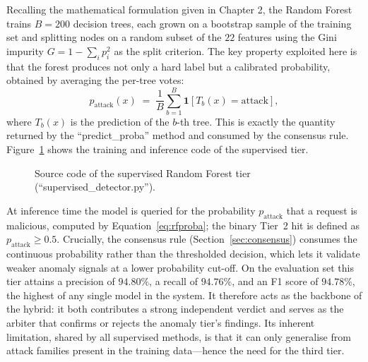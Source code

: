 \documentclass[12pt,a4paper]{report}
\begin{document}
Recalling the mathematical formulation given in Chapter 2, the Random Forest
trains $B = 200$ decision trees, each grown on a bootstrap sample of the
training set and splitting nodes on a random subset of the $22$ features
using the Gini impurity $G = 1 - \sum_i p_i^2$ as the split criterion. The
key property exploited here is that the forest produces not only a hard label
but a calibrated probability, obtained by averaging the per-tree votes:
\begin{equation}
  p_{\text{attack}}(x) \;=\; \frac{1}{B}\sum_{b=1}^{B} \mathbf{1}\!\left[T_b(x) = \text{attack}\right],
  \label{eq:rfproba}
\end{equation}
where $T_b(x)$ is the prediction of the $b$-th tree. This is exactly the
quantity returned by the ``predict\_proba'' method and consumed by the
consensus rule. Figure~\ref{fig:code-rf} shows the training and inference
code of the supervised tier.

\begin{figure}[ht]
  \centering
  \caption{Source code of the supervised Random Forest tier
           (``supervised\_detector.py'').}
  \label{fig:code-rf}
\end{figure}

At inference time the model is queried for the probability
$p_{\text{attack}}$ that a request is malicious, computed by
Equation~\eqref{eq:rfproba}; the binary Tier~2 hit is
defined as $p_{\text{attack}} \geq 0.5$. Crucially, the consensus rule
(Section~\ref{sec:consensus}) consumes the continuous probability rather
than the thresholded decision, which lets it validate weaker anomaly signals
at a lower probability cut-off. On the evaluation set this tier attains a
precision of $94.80\%$, a recall of $94.76\%$, and an F1 score of $94.78\%$,
the highest of any single model in the system. It therefore acts as the
backbone of the hybrid: it both contributes a strong independent verdict and
serves as the arbiter that confirms or rejects the anomaly tier's findings.
Its inherent limitation, shared by all supervised methods, is that it can
only generalise from attack families present in the training data---hence
the need for the third tier.
\end{document}
